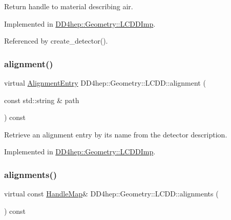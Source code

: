 Return handle to material describing air. 



Implemented in \hyperlink{class_d_d4hep_1_1_geometry_1_1_l_c_d_d_imp_a52ff3b93772cc1d6da6a27e7fbe5efd2}{D\+D4hep\+::\+Geometry\+::\+L\+C\+D\+D\+Imp}.



Referenced by create\+\_\+detector().

\hypertarget{class_d_d4hep_1_1_geometry_1_1_l_c_d_d_a5661c5a5c9519f58e3044fa66e5393fa}{}\label{class_d_d4hep_1_1_geometry_1_1_l_c_d_d_a5661c5a5c9519f58e3044fa66e5393fa} 
\subsubsection{\texorpdfstring{alignment()}{alignment()}}
{\footnotesize\ttfamily virtual \hyperlink{class_d_d4hep_1_1_geometry_1_1_alignment_entry}{Alignment\+Entry} D\+D4hep\+::\+Geometry\+::\+L\+C\+D\+D\+::alignment (\begin{DoxyParamCaption}\item[{const std\+::string \&}]{path }\end{DoxyParamCaption}) const\hspace{0.3cm}{\ttfamily [pure virtual]}}



Retrieve an alignment entry by it\textquotesingle{}s name from the detector description. 



Implemented in \hyperlink{class_d_d4hep_1_1_geometry_1_1_l_c_d_d_imp_a7df29f33bdb55b92fd13ad4fc95c61fe}{D\+D4hep\+::\+Geometry\+::\+L\+C\+D\+D\+Imp}.

\hypertarget{class_d_d4hep_1_1_geometry_1_1_l_c_d_d_a48553ea87301f9eb1237e41e7e2a0f16}{}\label{class_d_d4hep_1_1_geometry_1_1_l_c_d_d_a48553ea87301f9eb1237e41e7e2a0f16} 
\subsubsection{\texorpdfstring{alignments()}{alignments()}}
{\footnotesize\ttfamily virtual const \hyperlink{class_d_d4hep_1_1_geometry_1_1_l_c_d_d_a05cb11e7355772c7b0794bcca59bf477}{Handle\+Map}\& D\+D4hep\+::\+Geometry\+::\+L\+C\+D\+D\+::alignments (\begin{DoxyParamCaption}{ }\end{DoxyParamCaption}) const\hspace{0.3cm}{\ttfamily [pure virtual]}}



